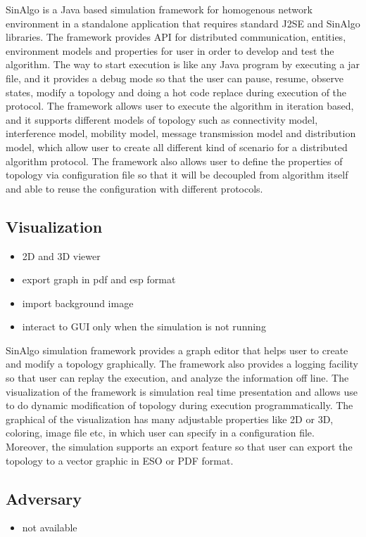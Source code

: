 SinAlgo is a Java based simulation framework for homogenous network environment in a standalone application that requires standard J2SE and SinAlgo libraries. The framework provides API for distributed communication, entities, environment models and properties for user in order to develop and test the algorithm. The way to start execution is like any Java program by executing a jar file, and it provides a debug mode so that the user can pause, resume, observe states, modify a topology and doing a hot code replace during execution of the protocol. The framework allows user to execute the algorithm in iteration based, and it supports different models of topology such as connectivity model, interference model, mobility model, message transmission model and distribution model, which allow user to create all different kind of scenario for a distributed algorithm protocol. The framework also allows user to define the properties of topology via configuration file so that it will be decoupled from algorithm itself and able to reuse the configuration with different protocols.

\subsection*{Visualization}
\begin{itemize}
\item 2D and 3D viewer
\item export graph in pdf and esp format
\item import background image
\item interact to GUI only when the simulation is not running
\end{itemize}

SinAlgo simulation framework provides a graph editor that helps user to create and modify a topology graphically. The framework also provides a logging facility so that user can replay the execution, and analyze the information off line. The visualization of the framework is simulation real time presentation and allows use to do dynamic modification of topology during execution programmatically. The graphical of the visualization has many adjustable properties like 2D or 3D, coloring, image file etc, in which user can specify in a configuration file. Moreover, the simulation supports an export feature so that user can export the topology to a vector graphic in ESO or PDF format.

\subsection*{Adversary}
\begin{itemize}
\item not available
\end{itemize}

